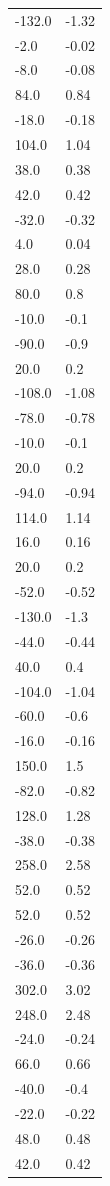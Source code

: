\begin{longtable}{ll}
-132.0 & -1.32 \\
-2.0 & -0.02 \\
-8.0 & -0.08 \\
84.0 & 0.84 \\
-18.0 & -0.18 \\
104.0 & 1.04 \\
38.0 & 0.38 \\
42.0 & 0.42 \\
-32.0 & -0.32 \\
4.0 & 0.04 \\
28.0 & 0.28 \\
80.0 & 0.8 \\
-10.0 & -0.1 \\
-90.0 & -0.9 \\
20.0 & 0.2 \\
-108.0 & -1.08 \\
-78.0 & -0.78 \\
-10.0 & -0.1 \\
20.0 & 0.2 \\
-94.0 & -0.94 \\
114.0 & 1.14 \\
16.0 & 0.16 \\
20.0 & 0.2 \\
-52.0 & -0.52 \\
-130.0 & -1.3 \\
-44.0 & -0.44 \\
40.0 & 0.4 \\
-104.0 & -1.04 \\
-60.0 & -0.6 \\
-16.0 & -0.16 \\
150.0 & 1.5 \\
-82.0 & -0.82 \\
128.0 & 1.28 \\
-38.0 & -0.38 \\
258.0 & 2.58 \\
52.0 & 0.52 \\
52.0 & 0.52 \\
-26.0 & -0.26 \\
-36.0 & -0.36 \\
302.0 & 3.02 \\
248.0 & 2.48 \\
-24.0 & -0.24 \\
66.0 & 0.66 \\
-40.0 & -0.4 \\
-22.0 & -0.22 \\
48.0 & 0.48 \\
42.0 & 0.42 \\

\end{longtable}
